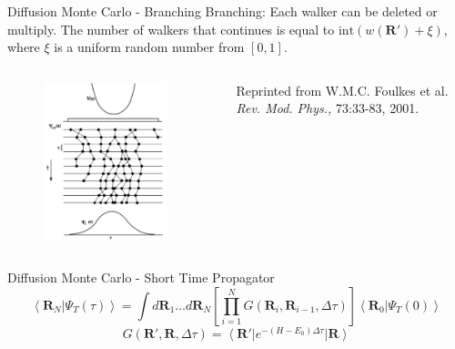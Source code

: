 \documentclass{beamer}
\newcommand{\ket}[1]{\left| #1 \right>}
\newcommand{\bra}[1]{\left< #1 \right|}
\newcommand{\braket}[2]{\left< #1 | #2 \right>}
\newcommand{\R}{\mathbf{R}}
\begin{document}
\begin{frame}{Diffusion Monte Carlo - Branching}
Branching: Each walker can be deleted or multiply. The number of walkers that continues is equal to $\mathrm{int}\left(w(\R')+\xi\right)$, where $\xi$ is a uniform random number from $[0,1]$.
\begin{columns}
\begin{column}{0.4\textwidth}
\begin{figure}
   \includegraphics[width=0.9\textwidth]{branch_full.png}
\end{figure}
\end{column}
\begin{column}{0.7\textwidth}
   {\color{blue}{Figure:}} Reprinted from W.M.C. Foulkes et al. \textit{Rev. Mod. Phys.,} 73:33-83, 2001.
\end{column}
\end{columns}
\end{frame}

\begin{frame}{Diffusion Monte Carlo - Short Time Propagator}
   \begin{equation*}
      \braket{\R_N}{\Psi_T(\tau)} = \int d\R_1 \ldots d\R_N \left[\prod\limits_{i=1}^N G(\R_i,\R_{i-1},\Delta\tau)\right] \braket{\R_0}{\Psi_T(0)}
   \end{equation*}
   \begin{equation*}
      G(\R',\R,\Delta\tau) = \bra{\R'}e^{-(H-E_0)\Delta\tau}\ket{\R}
   \end{equation*}
\end{frame}
\end{document}
